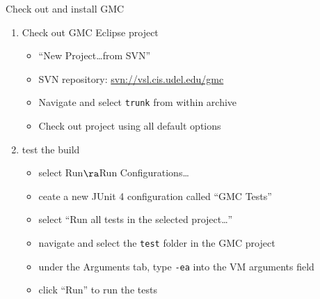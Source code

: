 \documentclass[t]{beamer}
\begin{document}
\begin{frame}{Check out and install GMC}
  \begin{enumerate}
  \item Check out GMC Eclipse project 
    \begin{itemize}
    \item ``New Project\ldots from SVN''
    \item SVN repository: \url{svn://vsl.cis.udel.edu/gmc}
    \item Navigate and select \texttt{trunk} from within archive
    \item Check out project using all default options
    \end{itemize}
  \item test the build
    \begin{itemize}
    \item select Run$\ra$Run Configurations\ldots
    \item ceate a new JUnit 4 configuration called ``GMC Tests''
    \item select ``Run all tests in the selected project\ldots''
    \item navigate and select the \texttt{test} folder in the GMC project
    \item under the Arguments tab, type \texttt{-ea} into the VM arguments field
    \item click ``Run'' to run the tests
    \end{itemize}
  \end{enumerate}
\end{frame}
\end{document}
